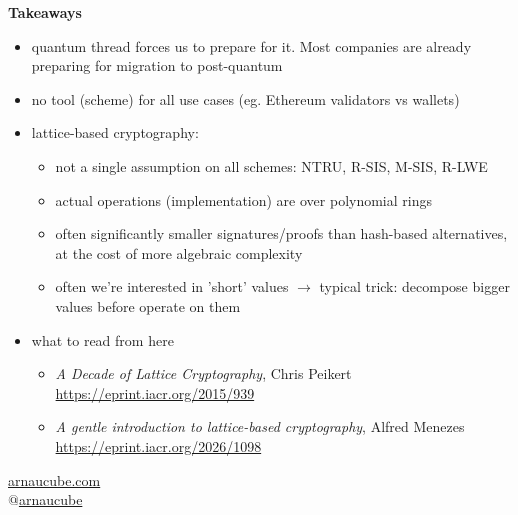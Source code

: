 \documentclass{beamer}
\theoremstyle{customstyle}
\begin{document}
{
\setlength{\leftmargini}{0.2em}
\setlength{\leftmarginii}{1.2em}

\begin{frame}{}
  \small
  \textbf{Takeaways}

  \begin{itemize}
    \item quantum thread forces us to prepare for it. Most companies are already preparing for migration to post-quantum
      \pause
    \item no tool (scheme) for all use cases (eg. Ethereum validators vs wallets)
      \pause
    \item lattice-based cryptography:

    \scriptsize{
    \begin{itemize}
      \item not a single assumption on all schemes: NTRU, R-SIS, M-SIS, R-LWE
      \item actual operations (implementation) are over polynomial rings
      \item often significantly smaller signatures/proofs than hash-based alternatives, at the cost of more algebraic complexity
      \item often we're interested in 'short' values $\longrightarrow$ typical trick: decompose bigger values before operate on them
    \end{itemize}
    }
    \small

    \pause
    \item what to read from here
    \begin{itemize}
      \item \emph{A Decade of Lattice Cryptography}, Chris Peikert \href{https://eprint.iacr.org/2015/939}{https://eprint.iacr.org/2015/939}
      \item \emph{A gentle introduction to lattice-based cryptography}, Alfred Menezes \href{https://eprint.iacr.org/2026/1098}{https://eprint.iacr.org/2026/1098}
    \end{itemize}
  \end{itemize}

  \vspace{0.4cm}
  \centering
  \href{https://arnaucube.com}{arnaucube.com}\\
  \href{https://x.com/arnaucube}{$@$arnaucube}
\end{frame}
}
\end{document}
